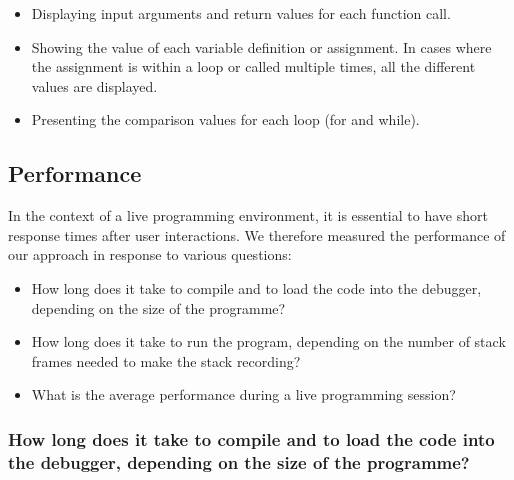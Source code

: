 \documentclass[english,submission]{programming}
\begin{document}
\begin{itemize}
  \item Displaying input arguments and return values for each function call.
  \item Showing the value of each variable definition or assignment. In cases where the assignment is within a loop or called multiple times, all the different values are displayed.
  \item Presenting the comparison values for each loop (for and while).
\end{itemize}
    
\subsection{Performance}
\label{sec:performance}

In the context of a live programming environment, it is essential to have short response times after user interactions. 
We therefore measured the performance of our approach in response to various questions:

\begin{itemize}
  \item How long does it take to compile and to load the code into the debugger, depending on the size of the programme?
  \item How long does it take to run the program, depending on the number of stack frames needed to make the stack recording?
  \item What is the average performance during a live programming session?
\end{itemize}

\subsubsection{How long does it take to compile and to load the code into the debugger, depending on the size of the programme?}
\end{document}
